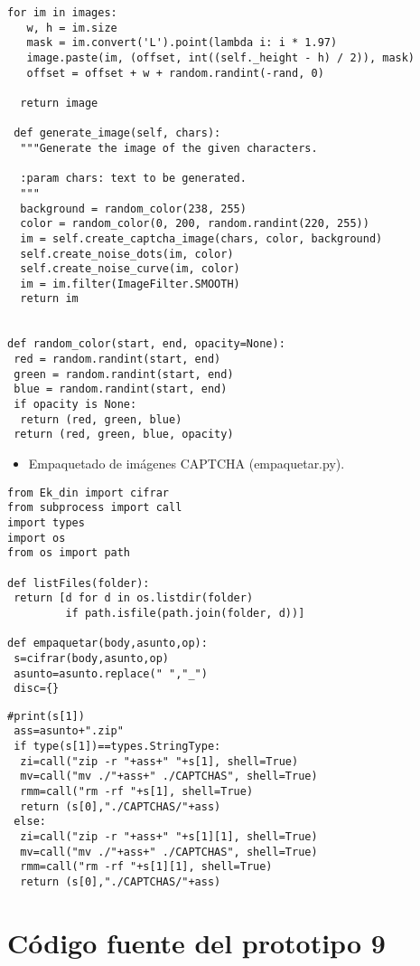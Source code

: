 \begin{lstlisting}[frame=single]
  for im in images:
   w, h = im.size
   mask = im.convert('L').point(lambda i: i * 1.97)
   image.paste(im, (offset, int((self._height - h) / 2)), mask)
   offset = offset + w + random.randint(-rand, 0)

  return image

 def generate_image(self, chars):
  """Generate the image of the given characters.

  :param chars: text to be generated.
  """
  background = random_color(238, 255)
  color = random_color(0, 200, random.randint(220, 255))
  im = self.create_captcha_image(chars, color, background)
  self.create_noise_dots(im, color)
  self.create_noise_curve(im, color)
  im = im.filter(ImageFilter.SMOOTH)
  return im


def random_color(start, end, opacity=None):
 red = random.randint(start, end)
 green = random.randint(start, end)
 blue = random.randint(start, end)
 if opacity is None:
  return (red, green, blue)
 return (red, green, blue, opacity)
\end{lstlisting}
\begin{itemize}
\item Empaquetado de imágenes CAPTCHA (empaquetar.py).
\end{itemize}

\begin{lstlisting}[frame=single]
from Ek_din import cifrar
from subprocess import call
import types
import os
from os import path

def listFiles(folder):
 return [d for d in os.listdir(folder) 
         if path.isfile(path.join(folder, d))]

def empaquetar(body,asunto,op):
 s=cifrar(body,asunto,op)
 asunto=asunto.replace(" ","_")
 disc={}
\end{lstlisting}
\begin{lstlisting}[frame=single]
 #print(s[1])
 ass=asunto+".zip"
 if type(s[1])==types.StringType:
  zi=call("zip -r "+ass+" "+s[1], shell=True)
  mv=call("mv ./"+ass+" ./CAPTCHAS", shell=True)
  rmm=call("rm -rf "+s[1], shell=True)
  return (s[0],"./CAPTCHAS/"+ass)
 else:
  zi=call("zip -r "+ass+" "+s[1][1], shell=True)
  mv=call("mv ./"+ass+" ./CAPTCHAS", shell=True)
  rmm=call("rm -rf "+s[1][1], shell=True)
  return (s[0],"./CAPTCHAS/"+ass)
\end{lstlisting}

\chapter{Código fuente del prototipo 9}
\label{Anexos C}


